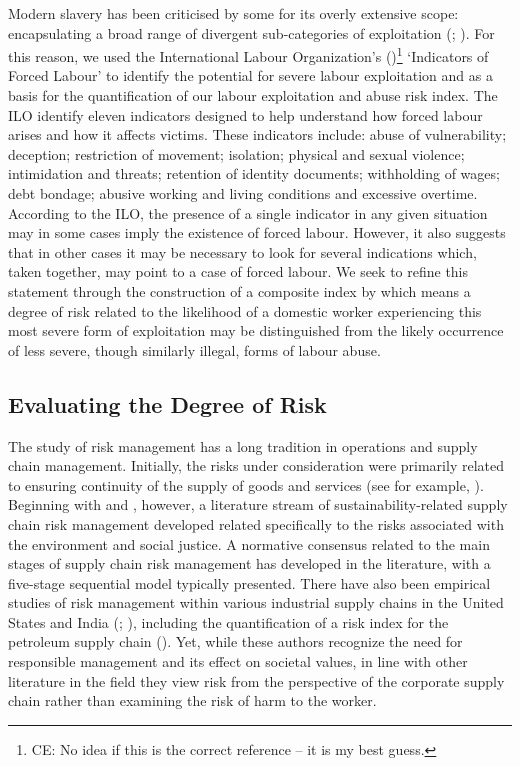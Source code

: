 \documentclass[
  12pt,
  letterpaper,
  DIV=11,
  numbers=noendperiod]{scrartcl}
\theoremstyle{plain}
\theoremstyle{definition}
\begin{document}
Modern slavery has been criticised by some for its overly extensive
scope: encapsulating a broad range of divergent sub-categories of
exploitation (\textcite{oconnell_davidson_margins_2015};
\textcite{gutierrez-huerter_o_change_2023}). For this reason, we used
the International Labour Organization's
(\textcite{ILO11-indicators})\footnote{CE: No idea if this is the
  correct reference -- it is my best guess.} `Indicators of Forced
Labour' to identify the potential for severe labour exploitation and as
a basis for the quantification of our labour exploitation and abuse risk
index. The ILO identify eleven indicators designed to help understand
how forced labour arises and how it affects victims. These indicators
include: abuse of vulnerability; deception; restriction of movement;
isolation; physical and sexual violence; intimidation and threats;
retention of identity documents; withholding of wages; debt bondage;
abusive working and living conditions and excessive overtime. According
to the ILO, the presence of a single indicator in any given situation
may in some cases imply the existence of forced labour. However, it also
suggests that in other cases it may be necessary to look for several
indications which, taken together, may point to a case of forced labour.
We seek to refine this statement through the construction of a composite
index by which means a degree of risk related to the likelihood of a
domestic worker experiencing this most severe form of exploitation may
be distinguished from the likely occurrence of less severe, though
similarly illegal, forms of labour abuse.

\subsection{Evaluating the Degree of
Risk}\label{evaluating-the-degree-of-risk}

The study of risk management has a long tradition in operations and
supply chain management. Initially, the risks under consideration were
primarily related to ensuring continuity of the supply of goods and
services (see for example, \textcite{juttner_supply_2003}). Beginning
with \textcite{anderson_critical_2006} and
\textcite{anderson_sustainability_2009}, however, a literature stream of
sustainability-related supply chain risk management developed related
specifically to the risks associated with the environment and social
justice. A normative consensus related to the main stages of supply
chain risk management has developed in the literature, with a five-stage
sequential model typically presented. There have also been empirical
studies of risk management within various industrial supply chains in
the United States and India (\textcite{tarei_hybrid_2018};
\textcite{dellana_scale_2021}), including the quantification of a risk
index for the petroleum supply chain (\textcite{tarei_hybrid_2018}).
Yet, while these authors recognize the need for responsible management
and its effect on societal values, in line with other literature in the
field they view risk from the perspective of the corporate supply chain
rather than examining the risk of harm to the worker.
\end{document}
